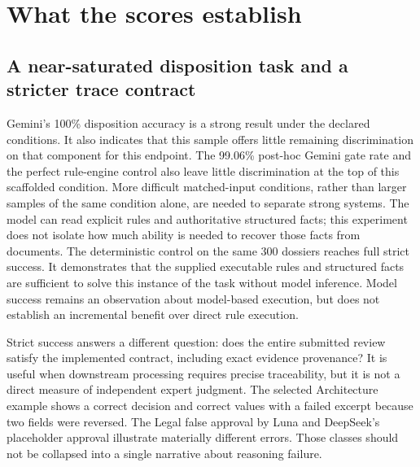 \section{What the scores establish}
\label{sec:measurement}

\subsection{A near-saturated disposition task and a stricter trace contract}

Gemini's 100\% disposition accuracy is a strong result under the declared conditions. It also
indicates that this sample offers little remaining discrimination on that component for this
endpoint. The 99.06\% post-hoc Gemini gate rate and the perfect rule-engine control also
leave little discrimination at the top of this scaffolded condition. More difficult matched-input
conditions, rather than larger samples of the same condition alone, are needed to separate
strong systems. The model can read explicit rules and authoritative structured facts; this experiment
does not isolate how much ability is needed to recover those facts from documents. The deterministic control on the same 300 dossiers reaches full strict success.
It demonstrates that the supplied executable rules and structured facts are sufficient to solve
this instance of the task without model inference. Model success remains an observation about
model-based execution, but does not establish an incremental benefit over direct rule execution.

Strict success answers a different question: does the entire submitted review satisfy the
implemented contract, including exact evidence provenance? It is useful when downstream processing
requires precise traceability, but it is not a direct measure of independent expert judgment.
The selected Architecture example shows a correct decision and correct values with a failed
excerpt because two fields were reversed. The Legal false approval by Luna and DeepSeek's
placeholder approval illustrate materially different errors. Those classes should not be
collapsed into a single narrative about reasoning failure.

